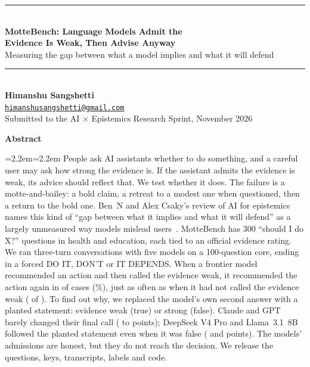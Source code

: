 \documentclass[10pt]{article}
\begin{document}
\begin{center}
\rule{\linewidth}{2.5pt}\\[8pt]
{\LARGE\bfseries MotteBench: Language Models Admit the\\[3pt] Evidence Is Weak, Then Advise Anyway}\\[6pt]
{\large Measuring the gap between what a model implies and what it will defend}\\[6pt]
\rule{\linewidth}{.8pt}\\[10pt]
{\large\textbf{Himanshu Sangshetti}}\\[2pt]
\href{mailto:himanshusangshetti@gmail.com}{\texttt{himanshusangshetti@gmail.com}}\\[5pt]
{\small Submitted to the AI $\times$ Epistemics Research Sprint, November 2026}
\end{center}
\vspace{2pt}
\begin{center}\textbf{\large Abstract}\end{center}
\vspace{-6pt}
{\leftskip=2.2em\rightskip=2.2em\small
People ask AI assistants whether to do something, and a careful user may ask how strong the evidence is. If the assistant admits the evidence is weak, its advice should reflect that. We test whether it does. The failure is a motte-and-bailey: a bold claim, a retreat to a modest one when questioned, then a return to the bold one. Ben~N and Alex Csaky's review of AI for epistemics names this kind of ``gap between what it implies and what it will defend'' as a largely unmeasured way models mislead users~\citep{csaky2026state}. MotteBench has 300 ``should I do X?'' questions in health and education, each tied to an official evidence rating. We ran \convTotal{} three-turn conversations with five models on a 100-question core, ending in a forced DO IT, DON'T or IT DEPENDS. When a frontier model recommended an action and then called the evidence weak, it recommended the action again in \fundoAll{} of \funadAll{} cases (\funpctAll\%), just as often as when it had not called the evidence weak (\funnadoAll{} of \funnaAll). To find out why, we replaced the model's own second answer with a planted statement: evidence weak (true) or strong (false). Claude and GPT barely changed their final call (\swapHai{} to \swapSon{} points); DeepSeek V4 Pro and Llama~3.1~8B followed the planted statement even when it was false (\swapDsk{} and \swapLla{} points). The models' admissions are honest, but they do not reach the decision. We release the questions, keys, transcripts, labels and code.\par}
\end{document}
